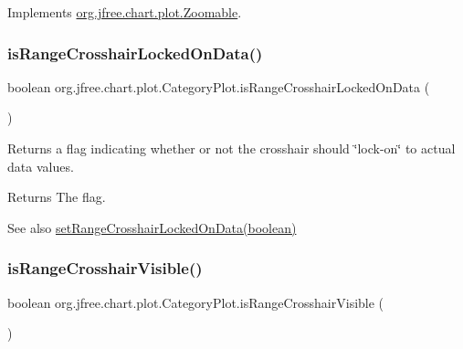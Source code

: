 Implements \mbox{\hyperlink{interfaceorg_1_1jfree_1_1chart_1_1plot_1_1_zoomable_a7c10a2f8573d8238ce31a4ee8d7dd2db}{org.\+jfree.\+chart.\+plot.\+Zoomable}}.

\mbox{\label{classorg_1_1jfree_1_1chart_1_1plot_1_1_category_plot_ad14fc326734b3094e9b0f6fb5e93e0bf}} 
\subsubsection{\texorpdfstring{is\+Range\+Crosshair\+Locked\+On\+Data()}{isRangeCrosshairLockedOnData()}}
{\footnotesize\ttfamily boolean org.\+jfree.\+chart.\+plot.\+Category\+Plot.\+is\+Range\+Crosshair\+Locked\+On\+Data (\begin{DoxyParamCaption}{ }\end{DoxyParamCaption})}

Returns a flag indicating whether or not the crosshair should \char`\"{}lock-\/on\char`\"{} to actual data values.

\begin{DoxyReturn}{Returns}
The flag.
\end{DoxyReturn}
\begin{DoxySeeAlso}{See also}
\mbox{\hyperlink{classorg_1_1jfree_1_1chart_1_1plot_1_1_category_plot_a95ddd96d6edb4b47d0157de79aa890aa}{set\+Range\+Crosshair\+Locked\+On\+Data(boolean)}} 
\end{DoxySeeAlso}
\mbox{\label{classorg_1_1jfree_1_1chart_1_1plot_1_1_category_plot_ab7277c96161f03a087953b3313b39c47}} 
\subsubsection{\texorpdfstring{is\+Range\+Crosshair\+Visible()}{isRangeCrosshairVisible()}}
{\footnotesize\ttfamily boolean org.\+jfree.\+chart.\+plot.\+Category\+Plot.\+is\+Range\+Crosshair\+Visible (\begin{DoxyParamCaption}{ }\end{DoxyParamCaption})}

